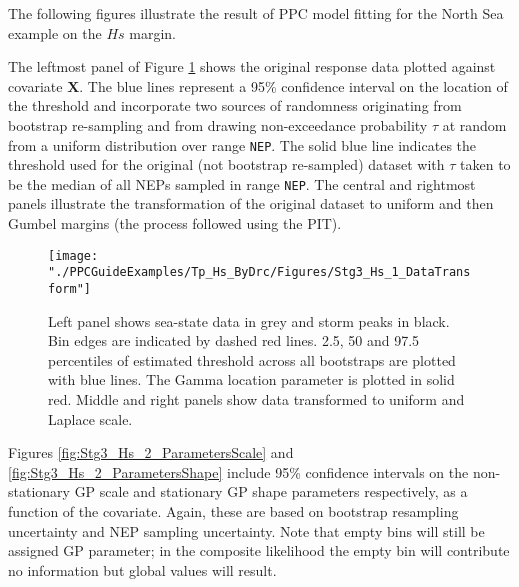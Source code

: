 The following figures illustrate the result of PPC model fitting for the North Sea example on the $Hs$ margin.

The leftmost panel of Figure \ref{fig:Stg3_Hs_1_DataTransform} shows the original response data plotted against covariate $\boldsymbol{X}$. The blue lines represent a 95\% confidence interval on the location of the threshold and incorporate two sources of randomness originating from bootstrap re-sampling and from drawing non-exceedance probability $\tau$ at random from a uniform distribution over range \verb|NEP|. The solid blue line indicates the threshold used for the original (not bootstrap re-sampled) dataset with $\tau$ taken to be the median of all NEPs sampled in range \verb|NEP|. The central and rightmost panels illustrate the transformation of the original dataset to uniform and then Gumbel margins (the process followed using the PIT). 

\vspace{10pt}
\noindent{}
\vspace{10pt}

\begin{figure}[h]
	\centering
	\texttt{[image: "./PPCGuideExamples/Tp\_Hs\_ByDrc/Figures/Stg3\_Hs\_1\_DataTransform"]}
	\caption{Left panel shows sea-state data in grey and storm peaks in black. Bin edges are indicated by dashed red lines. 2.5, 50 and 97.5 percentiles of estimated threshold across all bootstraps are plotted with blue lines. The Gamma location parameter is plotted in solid red. Middle and right panels show data transformed to uniform and Laplace scale.}
	\label{fig:Stg3_Hs_1_DataTransform}
\end{figure}

Figures \ref{fig:Stg3_Hs_2_ParametersScale} and \ref{fig:Stg3_Hs_2_ParametersShape} include 95\% confidence intervals on the non-stationary GP scale and stationary GP shape parameters respectively, as a function of the covariate. Again, these are based on bootstrap resampling uncertainty and NEP sampling uncertainty. Note that empty bins will still be assigned GP parameter; in the composite likelihood the empty bin will contribute no information but global values will result. 

